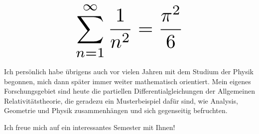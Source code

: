 \begin{multicols}{2}
\[
\resizebox{0.45\hsize}{!}{$\displaystyle\sum_{n = 1}^\infty \frac{1}{n^2} = \frac{\pi^2}{6}$}
\]

Ich persönlich habe übrigens auch vor vielen Jahren mit dem Studium der Physik begonnen, mich dann später immer weiter mathematisch orientiert. Mein eigenes Forschungsgebiet sind heute die partiellen Differentialgleichungen der Allgemeinen Relativitätstheorie, die geradezu ein Musterbeispiel dafür sind, wie Analysis, Geometrie und Physik zusammenhängen und sich gegenseitig befruchten.

Ich freue mich auf ein interessantes Semester mit Ihnen!

\end{multicols}

\vfill

\begin{center}
\end{center}
